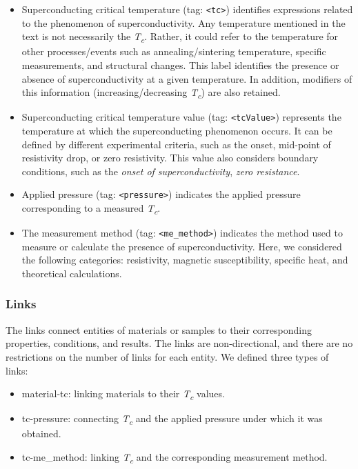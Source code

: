 \begin{itemize}
\item Superconducting critical temperature (tag: \texttt{<tc>}) identifies expressions related to the phenomenon of superconductivity. Any temperature mentioned in the text is not necessarily the \textit{T\textsubscript{c}}. Rather, it could refer to the temperature for other processes/events such as annealing/sintering temperature, specific measurements, and structural changes.
This label identifies the presence or absence of superconductivity at a given temperature.
In addition, modifiers of this information (increasing/decreasing \textit{T\textsubscript{c}}) are also retained. 

\item Superconducting critical temperature value (tag: \texttt{<tcValue>}) represents the temperature at which the superconducting phenomenon occurs. 
It can be defined by different experimental criteria, such as the onset, mid-point of resistivity drop, or zero resistivity.
This value also considers boundary conditions, such as the \textit{onset of superconductivity}, \textit{zero resistance}. 

\item Applied pressure (tag: \texttt{<pressure>}) indicates the applied pressure corresponding to a measured \textit{T\textsubscript{c}}. 

\item The measurement method (tag: \texttt{<me\_method>}) indicates the method used to measure or calculate the presence of superconductivity. Here, we considered the following categories: resistivity, magnetic susceptibility, specific heat, and theoretical calculations. 
\end{itemize}

\subsubsection{Links}
The links connect entities of materials or samples to their corresponding properties, conditions, and results. 
The links are non-directional, and there are no restrictions on the number of links for each entity. 
We defined three types of links:

\begin{itemize}
    \item material-tc: linking materials to their \textit{T\textsubscript{c}} values.
    \item tc-pressure: connecting \textit{T\textsubscript{c}} and the applied pressure under which it was obtained.
    \item tc-me\_method: linking \textit{T\textsubscript{c}} and the corresponding measurement method. 
\end{itemize}


